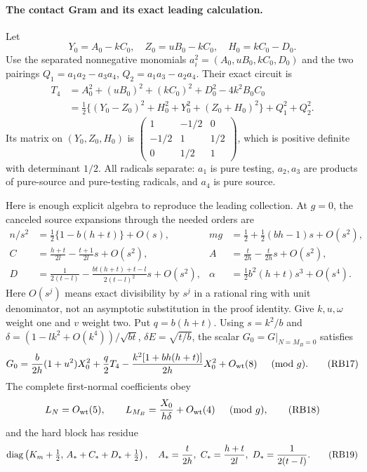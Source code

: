 \paragraph{The contact Gram and its exact leading calculation.}
Let
\[
 Y_0=A_0-kC_0,\quad Z_0=uB_0-kC_0,\quad H_0=kC_0-D_0.
\]
Use the separated nonnegative monomials $a_i^2=(A_0,uB_0,kC_0,D_0)$
and the two pairings $Q_1=a_1a_2-a_3a_4$,
$Q_2=a_1a_3-a_2a_4$. Their exact circuit is
\[
\begin{split}
 T_4&=A_0^2+(uB_0)^2+(kC_0)^2+D_0^2-4k^2B_0C_0\\
 &=\tfrac12\{(Y_0-Z_0)^2+H_0^2+Y_0^2+(Z_0+H_0)^2\}
                   +Q_1^2+Q_2^2.
\end{split}                                      \tag{RB15}
\]
Its matrix on $(Y_0,Z_0,H_0)$ is
$\left(\begin{smallmatrix}1&-1/2&0\\-1/2&1&1/2\\0&1/2&1\end{smallmatrix}\right)$,
which is positive definite with determinant $1/2$. All radicals
separate: $a_1$ is pure testing, $a_2,a_3$ are products of pure-source
and pure-testing radicals, and $a_4$ is pure source.

Here is enough explicit algebra to reproduce the leading collection.
At $g=0$, the canceled source expansions through the needed orders are
\[
\begin{aligned}
 n/s^2&=\tfrac12\{1-b(h+t)\}+O(s),&
 mg&=\tfrac12+\tfrac12(bh-1)s+O(s^2),\\
 C&=\frac{h+t}{2l}-\frac{t+1}{2l}s+O(s^2),&
 A&=\frac t{2h}-\frac t{2h}s+O(s^2),\\
 D&=\frac1{2(t-l)}-
       \frac{bt(h+t)+t-l}{2(t-l)^2}s+O(s^2),&
 \alpha&=\tfrac12 b^2(h+t)s^3+O(s^4).
\end{aligned}                                                     \tag{RB16}
\]
Here $O(s^j)$ means exact divisibility by $s^j$ in a rational ring with
unit denominator, not an asymptotic substitution in the proof identity.
Give $k,u,\omega$ weight one and $v$ weight two. Put $q=b(h+t)$.
Using $s=k^2/b$ and
$\delta=(1-lk^2+O(k^4))/\sqrt{bt}$, $\delta E=\sqrt{t/b}$,
the scalar $G_0=G|_{N=M_B=0}$ satisfies
\[
 G_0=\frac b{2h}(1+u^2)X_0^2+\frac q2T_4
       -\frac{k^2[1+bh(h+t)]}{2h}X_0^2+O_{\rm wt}(8)
       \quad\pmod g.                               \tag{RB17}
\]
The complete first-normal coefficients obey
\[
 L_N=O_{\rm wt}(5),\qquad
 L_{M_B}=\frac{X_0}{h\delta}+O_{\rm wt}(4)\quad\pmod g,
 \tag{RB18}
\]
and the hard block has residue
\[
 \operatorname{diag}\left(K_m+\tfrac12,\,
           A_*+C_*+D_*+\tfrac12\right),
 \quad A_*={t\over2h},\ C_*={h+t\over2l},\ D_*={1\over2(t-l)}.
 \tag{RB19}
\]

